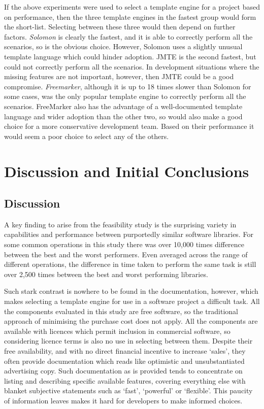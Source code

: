 If the above experiments were used to select a template engine for a project based on performance, then the three template engines in the fastest group would form the short-list. Selecting between these three would then depend on further factors. \emph{Solomon} is clearly the fastest, and it is able to correctly perform all the scenarios, so is the obvious choice. However, Solomon uses a slightly unusual template language which could hinder adoption. JMTE is the second fastest, but could not correctly perform all the scenarios. In development situations where the missing features are not important, however, then JMTE could be a good compromise. \emph{Freemarker}, although it is up to 18 times slower than Solomon for some cases, was the only popular template engine to correctly perform all the scenarios. FreeMarker also has the advantage of a well-documented template language and wider adoption than the other two, so would also make a good choice for a more conservative development team. Based on their performance it would seem a poor choice to select any of the others.

\section{Discussion and Initial Conclusions}
\label{fs:discussion}

\subsection{Discussion}

A key finding to arise from the feasibility study is the surprising variety in capabilities and performance between purportedly similar software libraries. For some common operations in this study there was over 10,000 times difference between the best and the worst performers. Even averaged across the range of different operations, the difference in time taken to perform the same task is still over 2,500 times between the best and worst performing libraries.

Such stark contrast is nowhere to be found in the documentation, however, which makes selecting a template engine for use in a software project a difficult task. All the components evaluated in this study are free software, so the traditional approach of minimising the purchase cost does not apply. All the components are available with licences which permit inclusion in commercial software, so considering licence terms is also no use in selecting between them. Despite their free availability, and with no direct financial incentive to increase `sales', they often provide documentation which reads like optimistic and unsubstantiated advertising copy. Such documentation as is provided tends to concentrate on listing and describing specific available features, covering everything else with blanket subjective statements such as `fast', `powerful' or `flexible'. This paucity of information leaves makes it hard for developers to make informed choices.

